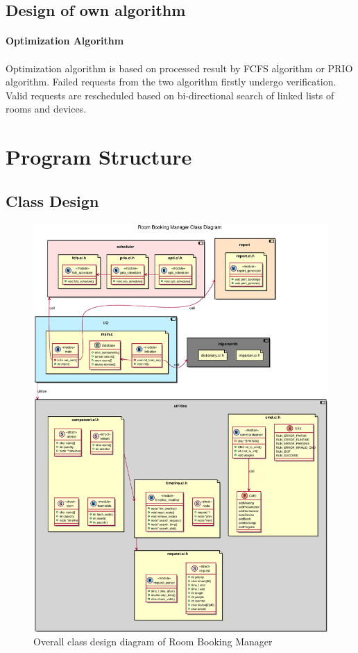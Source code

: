 \documentclass{article}
\begin{document}
        \subsection{Design of own algorithm }
            \paragraph{Optimization Algorithm}
            \paragraph{}
                Optimization algorithm is based on processed result by FCFS algorithm or
                PRIO algorithm. Failed requests from the two algorithm firstly undergo
                verification. Valid requests are rescheduled based on bi-directional
                search of linked lists of rooms and devices. 
    \cleardoublepage
    \section{Program Structure}
        \subsection{Class Design}
            \begin{figure}[!htbp]
                \centering
                \includegraphics[scale=0.4]{./img/class_diagram.eps}
                \caption{Overall class design diagram of Room Booking Manager}
            \end{figure}
\end{document}
